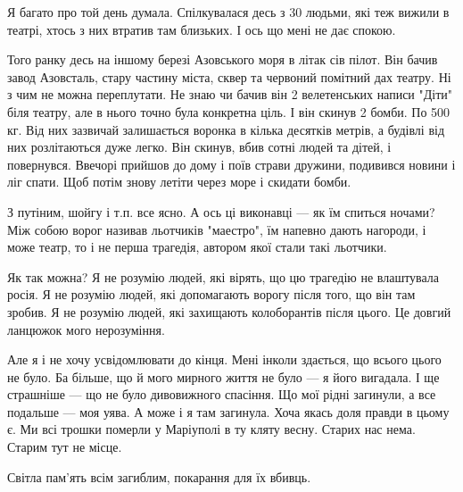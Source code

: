 Я багато про той день думала. Спілкувалася десь з 30 людьми, які теж вижили в
театрі, хтось з них втратив там близьких. І ось що мені не дає спокою.

Того ранку десь на іншому березі Азовського моря в літак сів пілот. Він бачив
завод Азовсталь, стару частину міста, сквер та червоний помітний дах театру. Ні
з чим не можна переплутати. Не знаю чи бачив він 2 велетенських написи "Діти"
біля театру, але в нього точно була конкретна ціль. І він скинув 2 бомби. По
500 кг. Від них зазвичай залишається воронка в кілька десятків метрів, а
будівлі від них розлітаються дуже легко. Він скинув, вбив сотні людей та дітей,
і повернувся. Ввечорі прийшов до дому і поїв страви дружини, подивився новини і
ліг спати. Щоб потім знову летіти через море і скидати бомби.

З путіним, шойгу і т.п. все ясно. А ось ці виконавці — як їм спиться ночами?
Між собою ворог називав льотчиків "маестро", їм напевно дають нагороди, і може
театр, то і не перша трагедія, автором якої стали такі льотчики. 

Як так можна? Я не розумію людей, які вірять, що цю трагедію не влаштувала
росія. Я не розумію людей, які допомагають ворогу після того, що він там
зробив. Я не розумію людей, які захищають колоборантів після цього. Це довгий
ланцюжок мого нерозуміння.

Але я і не хочу усвідомлювати до кінця. Мені інколи здається, що всього цього
не було. Ба більше, що й мого мирного життя не було — я його вигадала. І ще
страшніше — що не було дивовижного спасіння. Що мої рідні загинули, а все
подальше — моя уява. А може і я там загинула. Хоча якась доля правди в цьому є.
Ми всі трошки померли у Маріуполі в ту кляту весну. Старих нас нема. Старим тут
не місце. 

Світла пам'ять всім загиблим, покарання для їх вбивць.
